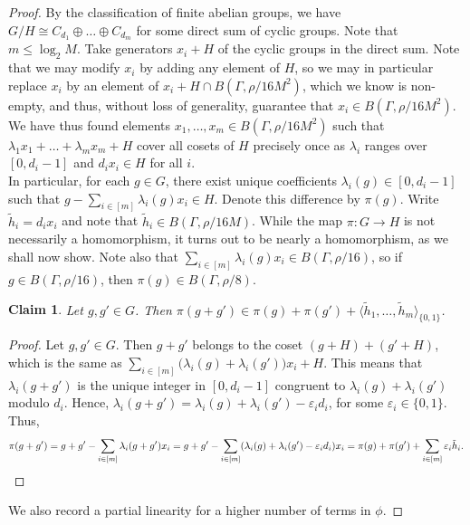 \documentclass[a4paper,11pt]{article}
\numberwithin{theorem}{section}
\newtheorem*{claim*}{Claim}
\theoremstyle{definition}
\begin{document}
\begin{proof}
By the classification of finite abelian groups, we have $G/H \cong C_{d_1} \oplus \dots \oplus C_{d_m}$ for some direct sum of cyclic groups. Note that $m \leq \log_2 M$. Take generators $x_i + H$ of the cyclic groups in the direct sum. Note that we may modify $x_i$ by adding any element of $H$, so we may in particular replace $x_i$ by an element of $x_i + H \cap B(\Gamma, \rho / 16M^2)$, which we know is non-empty, and thus, without loss of generality, guarantee that $x_i \in B(\Gamma, \rho / 16M^2)$. We have thus found elements $x_1, \dots, x_m \in B(\Gamma, \rho / 16M^2)$ such that $\lambda_1 x_1 + \dots + \lambda_m x_m + H$ cover all cosets of $H$ precisely once as $\lambda_i$ ranges over $[0, d_i - 1]$ and $d_i x_i \in H$ for all $i$.\\

In particular, for each $g \in G$, there exist unique coefficients $\lambda_i(g) \in [0, d_i - 1]$ such that $g - \sum_{i \in [m]} \lambda_i(g) x_i \in H$. Denote this difference by $\pi(g)$. Write $\tilde{h}_i = d_i x_i$ and note that $\tilde{h}_i \in B(\Gamma, \rho / 16M)$. While the map $\pi : G \to H$ is not necessarily a homomorphism, it turns out to be nearly a homomorphism, as we shall now show. Note also that $\sum_{i \in [m]} \lambda_i(g) x_i \in B(\Gamma, \rho / 16)$, so if $g \in B(\Gamma, \rho / 16)$, then $\pi(g) \in B(\Gamma, \rho/8)$.

    \begin{claim*}
        Let $g, g' \in G$. Then $\pi(g + g') \in \pi(g) + \pi(g') + \langle \tilde{h}_1, \dots, \tilde{h}_m\rangle_{\{0,1\}}$.
    \end{claim*}
    
    \begin{proof}
        Let $g, g' \in G$. Then $g + g'$ belongs to the coset $(g + H) + (g' + H)$, which is the same as $\sum_{i \in [m]} \Big(\lambda_i(g) + \lambda_i(g')\Big) x_i + H$. This means that $\lambda_i(g + g')$ is the unique integer in $[0, d_i - 1]$ congruent to $\lambda_i(g) + \lambda_i(g')$ modulo $d_i$. Hence, $\lambda_i(g + g') = \lambda_i(g) + \lambda_i(g') - \varepsilon_i d_i$, for some $\varepsilon_i \in \{0,1\}$. Thus,
        \[\pi(g + g') = g + g' -  \sum_{i \in [m]} \lambda_i(g + g') x_i = g + g' - \sum_{i \in [m]} (\lambda_i(g) + \lambda_i(g') - \varepsilon_i d_i) x_i = \pi(g) + \pi(g') + \sum_{i \in [m]} \varepsilon_i \tilde{h}_i.\qedhere\]
    \end{proof}

    We also record a partial linearity for a higher number of terms in $\phi$.


\end{proof}
\end{document}
